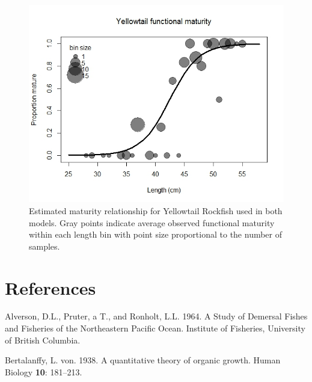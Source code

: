 \documentclass[12pt,]{article}
\begin{document}
\begin{figure}[htbp]
\centering
\includegraphics{Figures/YT_Propmat_update3_22.jpeg}
\caption{Estimated maturity relationship for Yellowtail Rockfish used in
both models. Gray points indicate average observed functional maturity
within each length bin with point size proportional to the number of
samples.\label{fig:maturity}}
\end{figure}

\FloatBarrier

\FloatBarrier

\FloatBarrier

\FloatBarrier

\FloatBarrier

\FloatBarrier

\newpage

\color{black}

\section*{References}\label{references}

\renewcommand{\thepage}{}

\hypertarget{refs}{}
\hypertarget{ref-Alverson1964}{}
Alverson, D.L., Pruter, a T., and Ronholt, L.L. 1964. A Study of
Demersal Fishes and Fisheries of the Northeastern Pacific Ocean.
Institute of Fisheries, University of British Columbia.

\hypertarget{ref-vonB1938}{}
Bertalanffy, L. von. 1938. A quantitative theory of organic growth.
Human Biology \textbf{10}: 181--213.
\end{document}
